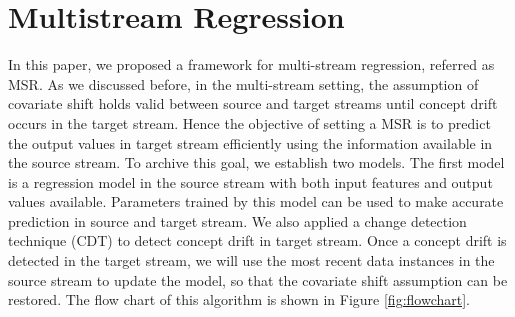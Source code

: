 \documentclass[conference,compsoc]{IEEEtran}
\begin{document}
\section{Multistream Regression}
In this paper, we proposed a framework for multi-stream regression, referred as MSR. As we discussed before, in the multi-stream setting, the assumption of covariate shift holds valid between source and target streams until concept drift occurs in the target stream. Hence the objective of setting a MSR is to predict the output values in target stream efficiently using the information available in the source stream. To archive this goal, we establish two models. The first model is a regression model in the source stream with both input features and output values available. Parameters trained by this model can be used to make accurate prediction in source and target stream. We also applied a change detection technique (CDT) to detect concept drift in target stream. Once a concept drift is detected in the target stream, we will use the most recent data instances in the source stream to update the model, so that the covariate shift assumption can be restored. The flow chart of this algorithm is shown in Figure \ref{fig:flowchart}.
\end{document}
